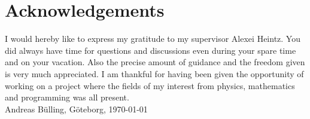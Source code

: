 \newpage
\clearpage
\mbox{}
\newpage
\clearpage
\thispagestyle{empty}
\section*{Acknowledgements}
I would hereby like to express my gratitude to my supervisor Alexei
Heintz. You did always have time for questions and discussions even
during your spare time and on your vacation. Also the precise amount
of guidance and the freedom given is very much appreciated. I am
thankful for having been given the opportunity of working on a project
where the fields of my interest from physics, mathematics and
programming was all present.  \\[1cm]

\hfill Andreas B\"{u}lling, G\"{o}teborg, \today
\newpage
\clearpage
\mbox{}

